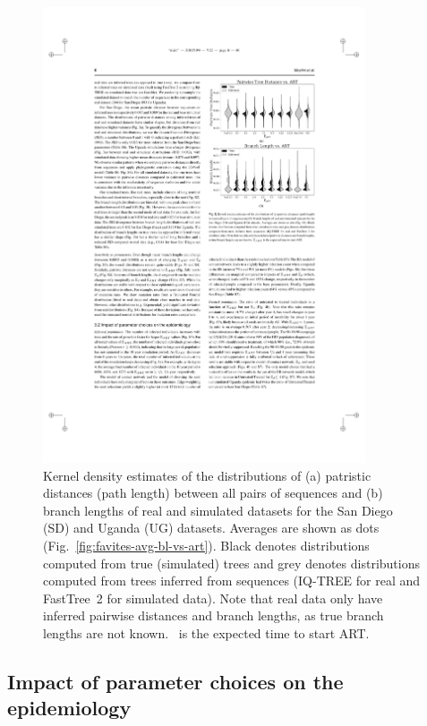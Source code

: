\begin{figure} %
\centering
\includegraphics[width=0.85\textwidth]{figs/favites-real-vs-sim}
\caption[Real vs. Simulated Data]
{Kernel density estimates of the distributions of (a) patristic distances (path length) between all pairs of sequences and (b) branch lengths of real and simulated datasets for the San Diego (SD) and Uganda (UG) datasets. Averages are shown as dots (Fig.~\ref{fig:favites-avg-bl-vs-art}). Black denotes distributions computed from true (simulated) trees and grey denotes distributions computed from trees inferred from sequences (IQ-TREE for real and FastTree~2 for simulated data).  Note that real data only have inferred pairwise distances and branch lengths, as true branch lengths are not known. \EART\ is the expected time to start ART.}
\label{fig:favites-real-vs-sim}
\end{figure}

\subsection{Impact of parameter choices on the epidemiology}
